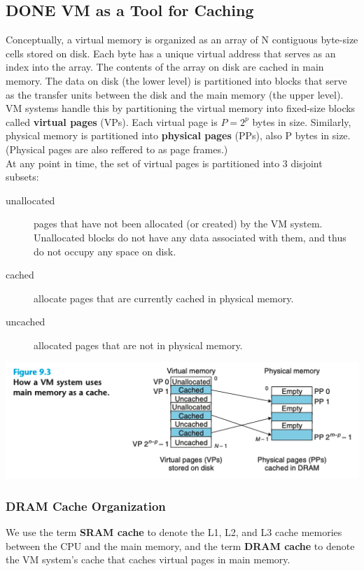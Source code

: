 \documentclass[11pt]{article}
\begin{document}
\subsection{{\bfseries\sffamily DONE} VM as a Tool for Caching}
\label{sec:org1d4fc5c}
Conceptually, a virtual memory is organized as an array of N contiguous byte-size cells stored on disk. Each byte has a unique virtual address that serves as an index into the array. The contents of the array on disk are cached in main memory. The data on disk (the lower level) is partitioned into  blocks that serve as the transfer units between the disk and the main memory (the upper level). VM systems handle this by partitioning the virtual memory into fixed-size blocks called \textbf{virtual pages} (VPs). Each virtual page is \(P = 2^p\) bytes in size. Similarly, physical memory is partitioned into \textbf{physical pages} (PPs), also P bytes in size. (Physical pages are also reffered to as page frames.)\\

At any point in time, the set of virtual pages is partitioned into 3 disjoint subsets:\\
\begin{description}
\item[{unallocated}] pages that have not been allocated (or created) by the VM system. Unallocated blocks do not have any data associated with them, and thus do not occupy any space on disk.\\
\item[{cached}] allocate pages that are currently cached in physical memory.\\
\item[{uncached}] allocated pages that are not in physical memory.\\
\end{description}

\begin{center}
\includegraphics[width=.9\linewidth]{pics/figure9.3-vm-system.png}
\end{center}

\subsubsection{DRAM Cache Organization}
\label{sec:orga7f00a9}
We use the term \textbf{SRAM cache} to denote the L1, L2, and L3 cache memories between the CPU and the main memory, and the term \textbf{DRAM cache} to denote the VM system's cache that caches virtual pages in main memory.\\
\end{document}
